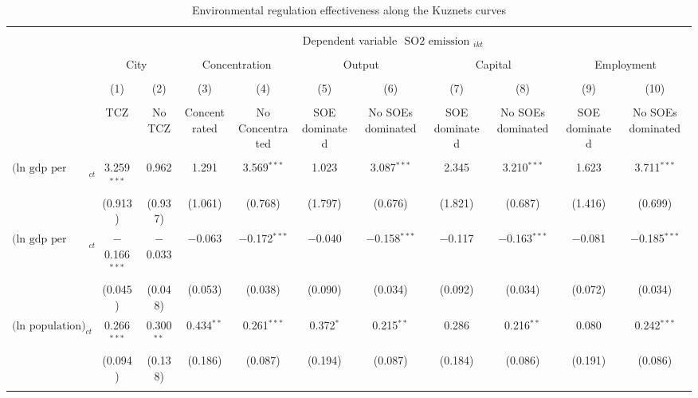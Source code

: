 \documentclass[12pt]{article}
\begin{document}
\begin{sidewaystable}%
  \caption{\\ Environmental regulation effectiveness along the Kuznets curves} 
\label{table_9}
\begin{adjustbox}{width=\textwidth, totalheight=\baselineskip,keepaspectratio}
\begin{tabular}{@{\extracolsep{5pt}}lcccccccccc} 
\\[-1.8ex]\hline 
\hline \\[-1.8ex] 
 & \multicolumn{10}{c}{Dependent variable $\text { SO2 emission }_{i k t}$} \\ 
\cline{2-11}
            
\\[-1.8ex]
            &\multicolumn{2}{c}{City}&\multicolumn{2}{c}{Concentration}&\multicolumn{2}{c}{Output}&\multicolumn{2}{c}{Capital}&\multicolumn{2}{c}{Employment}\\
\\[-1.8ex] & (1) & (2) & (3) & (4) & (5) & (6) & (7) & (8) & (9) & (10)\\
 \\[-1.8ex]& TCZ & No TCZ & Concentrated & No Concentrated & SOE dominated & No SOEs dominated & SOE dominated & No SOEs dominated & SOE dominated & No SOEs dominated\\
 \hline \\[-1.8ex] 
  $\text{(ln gdp per cap)}_{ct}$  & 3.259$^{***}$ & 0.962 & 1.291 & 3.569$^{***}$ & 1.023 & 3.087$^{***}$ & 2.345 & 3.210$^{***}$ & 1.623 & 3.711$^{***}$ \\ 
  & (0.913) & (0.937) & (1.061) & (0.768) & (1.797) & (0.676) & (1.821) & (0.687) & (1.416) & (0.699) \\ 
   $\text{(ln gdp per cap) squared}_{ct}$  & $-$0.166$^{***}$ & $-$0.033 & $-$0.063 & $-$0.172$^{***}$ & $-$0.040 & $-$0.158$^{***}$ & $-$0.117 & $-$0.163$^{***}$ & $-$0.081 & $-$0.185$^{***}$ \\ 
  & (0.045) & (0.048) & (0.053) & (0.038) & (0.090) & (0.034) & (0.092) & (0.034) & (0.072) & (0.034) \\ 
   $\text{(ln population)}_{ct}$  & 0.266$^{***}$ & 0.300$^{**}$ & 0.434$^{**}$ & 0.261$^{***}$ & 0.372$^{*}$ & 0.215$^{**}$ & 0.286 & 0.216$^{**}$ & 0.080 & 0.242$^{***}$ \\ 
  & (0.094) & (0.138) & (0.186) & (0.087) & (0.194) & (0.087) & (0.184) & (0.086) & (0.191) & (0.086) \\ 
 \hline \\[-1.8ex] 

\end{tabular}
\end{adjustbox}
\end{sidewaystable}
\end{document}
